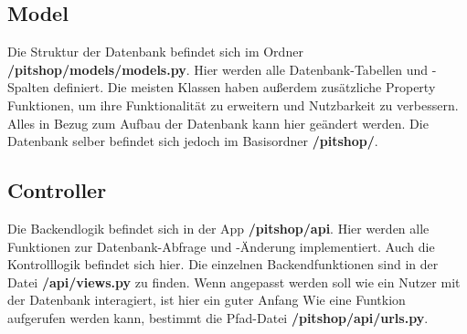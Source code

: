 \documentclass[12pt]{article}
\newcommand{\dir}[1]{\textbf{/#1}}
\begin{document}
\subsection{Model}
Die Struktur der Datenbank befindet sich im Ordner \dir{pitshop/models/models.py}. Hier werden alle Datenbank-Tabellen und -Spalten definiert.
Die meisten Klassen haben außerdem zusätzliche Property Funktionen, um ihre Funktionalität zu erweitern und Nutzbarkeit zu verbessern.
Alles in Bezug zum Aufbau der Datenbank kann hier geändert werden.
Die Datenbank selber befindet sich jedoch im Basisordner \dir{pitshop/}.

\subsection{Controller}
Die Backendlogik befindet sich in der App \dir{pitshop/api}. Hier werden alle Funktionen zur Datenbank-Abfrage und -Änderung implementiert.
Auch die Kontrolllogik befindet sich hier. Die einzelnen Backendfunktionen sind in der Datei \dir{api/views.py} zu finden.
Wenn angepasst werden soll wie ein Nutzer mit der Datenbank interagiert, ist hier ein guter Anfang
Wie eine Funtkion aufgerufen werden kann, bestimmt die Pfad-Datei \dir{pitshop/api/urls.py}. 
\end{document}
